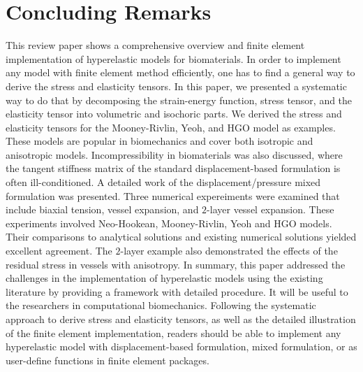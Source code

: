 \section{Concluding Remarks}
\label{conclusions}
This review paper shows a comprehensive overview and finite element implementation of hyperelastic models for biomaterials. In order to implement any model with finite element method efficiently, one has to find a general way to derive the stress and elasticity tensors. In this paper, we presented a systematic way to do that by decomposing the strain-energy function, stress tensor, and the elasticity tensor into volumetric and isochoric parts. We derived the stress and elasticity tensors for the Mooney-Rivlin, Yeoh, and HGO model as examples. These models are popular in biomechanics and cover both isotropic and anisotropic models. Incompressibility in biomaterials was also discussed, where the tangent stiffness matrix of the standard displacement-based formulation is often ill-conditioned. A detailed work of the displacement/pressure mixed formulation was presented. Three numerical expereiments were examined that include biaxial tension, vessel expansion, and $2$-layer vessel expansion. These experiments involved Neo-Hookean, Mooney-Rivlin, Yeoh and HGO models. Their comparisons to analytical solutions and existing numerical solutions yielded excellent agreement. The $2$-layer example also demonstrated the effects of the residual stress in vessels with anisotropy. In summary, this paper addressed the challenges in the implementation of hyperelastic models using the existing literature by providing a framework with detailed procedure. It will be useful to the researchers in computational biomechanics. Following the systematic approach to derive stress and elasticity tensors, as well as the detailed illustration of the finite element implementation, readers should be able to implement any hyperelastic model with displacement-based formulation, mixed formulation, or as user-define functions in finite element packages. 

